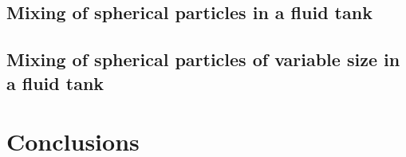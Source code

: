 \documentclass[preprint,12pt]{elsarticle}
\begin{document}











\FloatBarrier%
\subsection{Mixing of spherical particles in a fluid tank}
\label{sec:mixing-spherical-particles-in-fluid-tank}



\FloatBarrier%
\subsection{Mixing of spherical particles of variable size in a fluid tank}
\label{sec:mixing-spherical-particles-in-fluid-tank}





\FloatBarrier%
\section{Conclusions}
\label{sec:conclusions}






\end{document}
